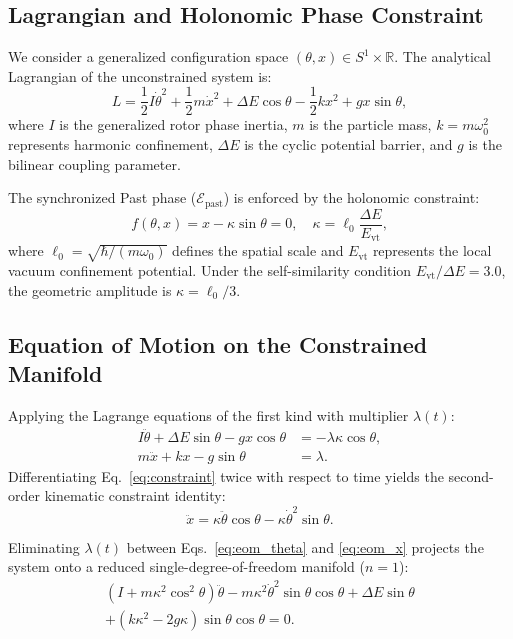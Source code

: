 \documentclass[aps,prc,twocolumn,superscriptaddress,amsmath,amssymb,nofootinbib]{revtex4-2}
\begin{document}
\subsection{Lagrangian and Holonomic Phase Constraint}
We consider a generalized configuration space \((\theta, x) \in S^1 \times \mathbb{R}\). The analytical Lagrangian of the unconstrained system is:
\begin{equation}
L = \frac{1}{2} I \dot{\theta}^2 + \frac{1}{2} m \dot{x}^2 + \Delta E \cos\theta - \frac{1}{2} k x^2 + g x \sin\theta,
\label{eq:lagrangian}
\end{equation}
where \(I\) is the generalized rotor phase inertia, \(m\) is the particle mass, \(k = m\omega_0^2\) represents harmonic confinement, \(\Delta E\) is the cyclic potential barrier, and \(g\) is the bilinear coupling parameter.

The synchronized Past phase (\(\mathcal{E}_{\text{past}}\)) is enforced by the holonomic constraint:
\begin{equation}
f(\theta, x) = x - \kappa \sin\theta = 0, \quad \kappa = \ell_0 \frac{\Delta E}{E_{\text{vt}}},
\label{eq:constraint}
\end{equation}
where \(\ell_0 = \sqrt{\hbar / (m\omega_0)}\) defines the spatial scale and \(E_{\text{vt}}\) represents the local vacuum confinement potential. Under the self-similarity condition \(E_{\text{vt}}/\Delta E = 3.0\), the geometric amplitude is \(\kappa = \ell_0 / 3\).

\subsection{Equation of Motion on the Constrained Manifold}
Applying the Lagrange equations of the first kind with multiplier \(\lambda(t)\):
\begin{align}
I \ddot{\theta} + \Delta E \sin\theta - g x \cos\theta &= -\lambda \kappa \cos\theta, \label{eq:eom_theta} \\
m \ddot{x} + k x - g \sin\theta &= \lambda. \label{eq:eom_x}
\end{align}
Differentiating Eq.~\eqref{eq:constraint} twice with respect to time yields the second-order kinematic constraint identity:
\begin{equation}
\ddot{x} = \kappa \ddot{\theta} \cos\theta - \kappa \dot{\theta}^2 \sin\theta.
\label{eq:kinematic}
\end{equation}

Eliminating \(\lambda(t)\) between Eqs.~\eqref{eq:eom_theta} and \eqref{eq:eom_x} projects the system onto a reduced single-degree-of-freedom manifold (\(n=1\)):
\begin{multline}
\left(I + m\kappa^2 \cos^2\theta\right)\ddot{\theta} - m\kappa^2 \dot{\theta}^2 \sin\theta \cos\theta + \Delta E \sin\theta \\
+ \left(k\kappa^2 - 2g\kappa\right)\sin\theta \cos\theta = 0.
\label{eq:reduced_eom}
\end{multline}
\end{document}
